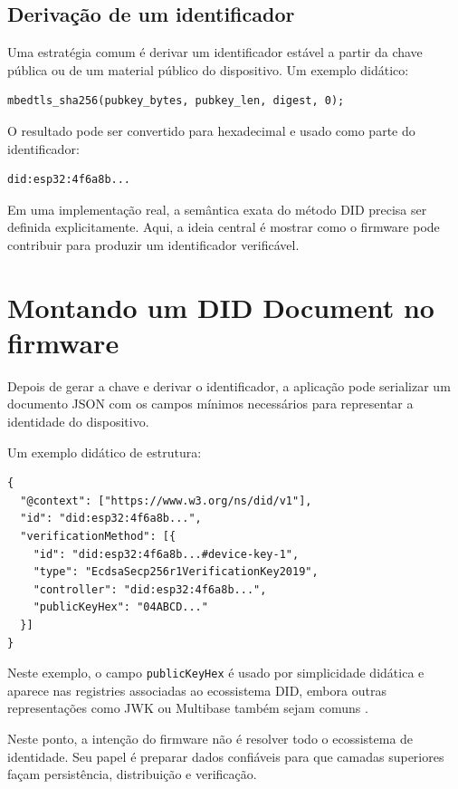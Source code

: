\subsection{Derivação de um identificador}
Uma estratégia comum é derivar um identificador estável a partir da chave pública ou de um material público do dispositivo. Um exemplo didático:
\begin{verbatim}
mbedtls_sha256(pubkey_bytes, pubkey_len, digest, 0);
\end{verbatim}

O resultado pode ser convertido para hexadecimal e usado como parte do identificador:
\begin{verbatim}
did:esp32:4f6a8b...
\end{verbatim}

Em uma implementação real, a semântica exata do método DID precisa ser definida explicitamente. Aqui, a ideia central é mostrar como o firmware pode contribuir para produzir um identificador verificável.

\section{Montando um DID Document no firmware}
Depois de gerar a chave e derivar o identificador, a aplicação pode serializar um documento JSON com os campos mínimos necessários para representar a identidade do dispositivo.

Um exemplo didático de estrutura:
\begin{verbatim}
{
  "@context": ["https://www.w3.org/ns/did/v1"],
  "id": "did:esp32:4f6a8b...",
  "verificationMethod": [{
    "id": "did:esp32:4f6a8b...#device-key-1",
    "type": "EcdsaSecp256r1VerificationKey2019",
    "controller": "did:esp32:4f6a8b...",
    "publicKeyHex": "04ABCD..."
  }]
}
\end{verbatim}

Neste exemplo, o campo \texttt{publicKeyHex} é usado por simplicidade didática e aparece nas registries associadas ao ecossistema DID, embora outras representações como JWK ou Multibase também sejam comuns \citep{w3c_did_spec_registries}.

Neste ponto, a intenção do firmware não é resolver todo o ecossistema de identidade. Seu papel é preparar dados confiáveis para que camadas superiores façam persistência, distribuição e verificação.

